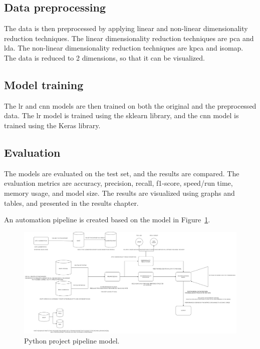 \subsection{Data preprocessing}\label{subsec:data-preprocessing}
The data is then preprocessed by applying linear and non-linear dimensionality reduction techniques. The linear dimensionality reduction techniques are \gls{pca} and \gls{lda}. The non-linear dimensionality reduction techniques are \gls{kpca} and \gls{isomap}. The data is reduced to 2 dimensions, so that it can be visualized.

\subsection{Model training}\label{subsec:model-training}
The \gls{lr} and \gls{cnn} models are then trained on both the original and the preprocessed data. The \gls{lr} model is trained using the \gls{sklearn} library, and the \gls{cnn} model is trained using the Keras library.

\subsection{Evaluation}\label{subsec:evaluation}
The models are evaluated on the test set, and the results are compared. The evaluation metrics are accuracy, precision, recall, f1-score, speed/run time, memory usage, and model size. The results are visualized using graphs and tables, and presented in the results chapter.






An automation pipeline is created based on the model in Figure~\ref{fig:python-pipeline-model}.


\begin{figure}[htb!]
    \centering
    \includegraphics[width=\textwidth]{figures/pipeline-draft.png}
    \caption{Python project pipeline model.}
    \label{fig:python-pipeline-model}
\end{figure}



